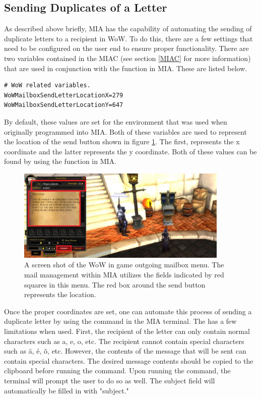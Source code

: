 \subsection{Sending Duplicates of a Letter}

As described above briefly, MIA has the capability of automating the sending of duplicate letters to a recipient in WoW. To do this, there are a few settings that need to be configured on the user end to ensure proper functionality. There are two variables contained in the MIAC (see section \ref{MIAC} for more information) that are used in conjunction with the  function in MIA. These are listed below.

\begin{lstlisting}
# WoW related variables.
WoWMailboxSendLetterLocationX=279
WoWMailboxSendLetterLocationY=647
\end{lstlisting}

By default, these values are set for the environment that was used when originally programmed into MIA. Both of these variables are used to represent the location of the send button shown in figure \ref{wow mailbox send}. The first,  represents the x coordinate and the latter  represents the y coordinate. Both of these values can be found by using the  function in MIA. 

\begin{figure}[h]
	\centering
	\includegraphics[width=0.9\textwidth]{images/WoWScrnShot_040518_181350b.jpg}
	\caption{A screen shot of the WoW in game outgoing mailbox menu. The mail management within MIA utilizes the fields indicated by red squares in this menu. The red box around the send button represents the  location.} \label{wow mailbox send}
\end{figure}

Once the proper coordinates are set, one can automate this process of sending a duplicate letter by using the  command in the MIA terminal. The  has a few limitations when used. First, the recipient of the letter can only contain normal characters such as a, e, o, etc. The recipient cannot contain special characters such as \"{a}, \'{e}, \~{o}, etc. However, the contents of the message that will be sent can contain special characters. The desired message contents should be copied to the clipboard before running the  command. Upon running the command, the terminal will prompt the user to do so as well. The subject field will automatically be filled in with "subject."

